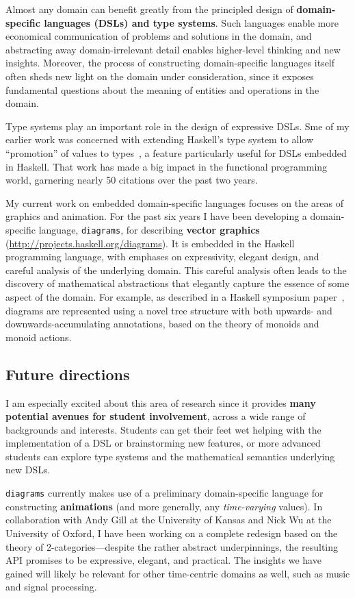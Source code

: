 \documentclass[12pt]{article}
\begin{document}
Almost any domain can benefit greatly from the principled design of
\textbf{domain-specific languages (DSLs) and type systems}.  Such
languages enable more economical communication of problems and
solutions in the domain, and abstracting away domain-irrelevant detail
enables higher-level thinking and new insights.  Moreover, the process
of constructing domain-specific languages itself often sheds new light
on the domain under consideration, since it exposes fundamental
questions about the meaning of entities and operations in the domain.

Type systems play an important role in the design of expressive DSLs.
Sme of my earlier work was concerned with extending Haskell's type
system to allow ``promotion'' of values to
types~\cite{Yorgey2012promotion}, a feature particularly useful for
DSLs embedded in Haskell.  That work has made a big impact in the
functional programming world, garnering nearly 50 citations over the
past two years.

My current work on embedded domain-specific languages focuses on the
areas of graphics and animation.  For the past six years I have been
developing a domain-specific language, \texttt{diagrams}, for
describing \textbf{vector graphics}
(\url{http://projects.haskell.org/diagrams}). It is embedded in the
Haskell programming language, with emphases on expressivity, elegant
design, and careful analysis of the underlying domain. This careful
analysis often leads to the discovery of mathematical abstractions
that elegantly capture the essence of some aspect of the domain.  For
example, as described in a Haskell symposium
paper~\cite{Yorgey2012monoids}, diagrams are represented using a novel
tree structure with both upwards- and downwards-accumulating
annotations, based on the theory of monoids and monoid actions.

\subsection*{Future directions}

I am especially excited about this area of research since it provides
\textbf{many potential avenues for student involvement}, across a wide
range of backgrounds and interests.  Students can get their feet wet
helping with the implementation of a DSL or brainstorming new
features, or more advanced students can explore type systems and the
mathematical semantics underlying new DSLs.

\texttt{diagrams} currently makes use of a preliminary domain-specific
language for constructing \textbf{animations} (and more generally, any
\emph{time-varying} values).  In collaboration with Andy Gill at the
University of Kansas and Nick Wu at the University of Oxford, I have
been working on a complete redesign based on the theory of
2-categories---despite the rather abstract underpinnings, the
resulting API promises to be expressive, elegant, and practical.  The
insights we have gained will likely be relevant for other time-centric
domains as well, such as music and signal processing.
\end{document}
